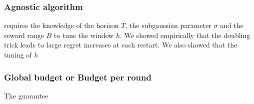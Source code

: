 \subsubsection{Agnostic algorithm}
\SWA requires the knowledge of the horizon $T$, the subgaussian parameter $\sigma$ and the reward range $B$  to tune the window $h$. We showed empirically that the doubling trick leads to large regret increases at each restart. We also showed that the tuning of $h$



\subsubsection{Global budget or Budget per round}
The guarantee
